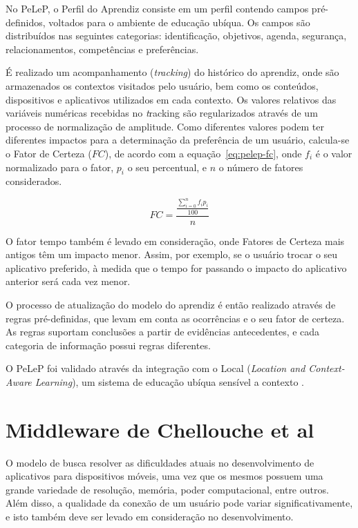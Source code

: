 No PeLeP, o Perfil do Aprendiz consiste em um perfil contendo campos pré-definidos, voltados para o ambiente de educação ubíqua. Os campos são distribuídos nas seguintes categorias: identificação, objetivos, agenda, segurança, relacionamentos, competências e preferências. 

É realizado um acompanhamento ({\em tracking}) do histórico do aprendiz, onde são armazenados os contextos visitados pelo usuário, bem como os conteúdos, dispositivos e aplicativos utilizados em cada contexto. Os valores relativos das variáveis numéricas recebidas no {\emph tracking} são regularizados através de um processo de normalização de amplitude. Como diferentes valores podem ter diferentes impactos para a determinação da preferência de um usuário, calcula-se o Fator de Certeza ($FC$), de acordo com a equação~\ref{eq:pelep-fc}, onde $f_i$ é o valor normalizado para o fator, $p_i$ o seu percentual, e $n$ o número de fatores considerados.

\begin{equation}
  FC = \frac{\frac{\displaystyle\sum_{i=0}^n f_i p_i}{100}}{n}
  \label{eq:pelep-fc}
\end{equation}

O fator tempo também é levado em consideração, onde Fatores de Certeza mais antigos têm um impacto menor. Assim, por exemplo, se o usuário trocar o seu aplicativo preferido, à medida que o tempo for passando o impacto do aplicativo anterior será cada vez menor.

O processo de atualização do modelo do aprendiz é então realizado através de regras pré-definidas, que levam em conta as ocorrências e o seu fator de certeza. As regras suportam conclusões a partir de evidências antecedentes, e cada categoria de informação possui regras diferentes.

O PeLeP foi validado através da integração com o Local ({\em Location and Context-Aware Learning}), um sistema de educação ubíqua sensível a contexto \cite{barbosa11}.


\section{Middleware de Chellouche et al}

O modelo de  busca resolver as dificuldades atuais no desenvolvimento de aplicativos para dispositivos móveis, uma vez que os mesmos possuem uma grande variedade de resolução, memória, poder computacional, entre outros. Além disso, a qualidade da conexão de um usuário pode variar significativamente, e isto também deve ser levado em consideração no desenvolvimento.

